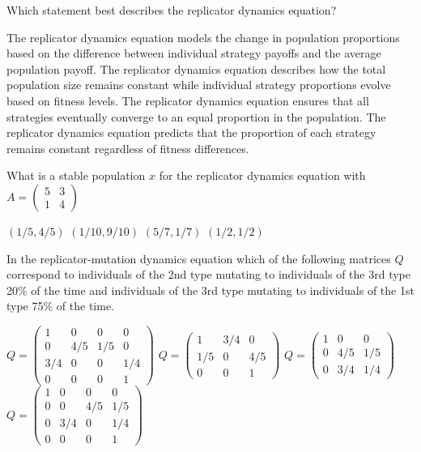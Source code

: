 \documentclass{exam}
\begin{document}
\begin{questions}
        
    \question
    Which statement best describes the replicator dynamics equation?

    \begin{checkboxes}
        \choice The replicator dynamics equation models the change in population proportions based on the difference between individual strategy payoffs and the average population payoff.
            \choice The replicator dynamics equation describes how the total population size remains constant while individual strategy proportions evolve based on fitness levels.
            \choice The replicator dynamics equation ensures that all strategies eventually converge to an equal proportion in the population.
            \choice The replicator dynamics equation predicts that the proportion of each strategy remains constant regardless of fitness differences.
    \end{checkboxes}

    \question What is a stable population \(x\) for the replicator dynamics
    equation with \(A=\begin{pmatrix}5 & 3\\ 1 & 4\end{pmatrix}\)

    \begin{checkboxes}
        \choice \((1/5, 4/5)\)
        \choice \((1/10, 9/10)\)
        \choice \((5/7, 1/7)\)
        \choice \((1/2, 1/2)\)
    \end{checkboxes}

    \question In the replicator-mutation dynamics equation which of the
    following matrices \(Q\) correspond to individuals of the 2nd type
    mutating to individuals of the 3rd type 20\% of the time and individuals of
    the 3rd type mutating to individuals of the 1st type 75\% of the time.
    \begin{checkboxes}
        \choice
    \(
        Q = \begin{pmatrix}1 & 0 & 0 & 0\\0 & 4/5 & 1/5 & 0\\ 3/4 & 0 & 0 & 1/4
        \\ 0 & 0 & 0 & 1\end{pmatrix}
    \)
        \choice
    \(
        Q = \begin{pmatrix}1 & 3/4 & 0 \\1/5 & 0 & 4 /5\\0 & 0 & 1\end{pmatrix}
    \)
        \choice
    \(
        Q = \begin{pmatrix}1 & 0 & 0\\0 & 4/5 & 1/5\\ 0 & 3/4 & 1/4 \end{pmatrix}
    \)
        \choice
    \(
        Q = \begin{pmatrix}1 & 0 & 0 & 0\\0 & 0 & 4/5 & 1/5\\ 0 & 3/4 & 0 & 1/4
        \\ 0 & 0 & 0 & 1\end{pmatrix}
    \)
\end{checkboxes}

\end{questions}
\end{document}
